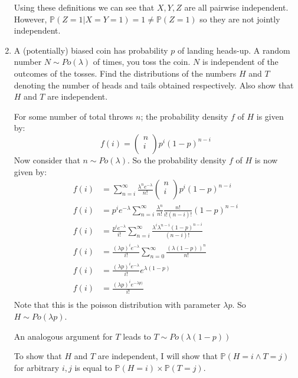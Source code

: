 \documentclass[10pt,\jkfside,a4paper]{article}
\begin{document}
\begin{enumerate}
Using these definitions we can see that $X, Y, Z$ are all pairwise independent.\\
However, $\mathbb{P}(Z=1|X=Y=1) = 1 \neq \mathbb{P}(Z=1)$ so they are not jointly independent.

\item

A (potentially) biased coin has probability $p$ of landing heads-up.
A random number $N \sim Po(\lambda)$ of times, you toss the coin.
$N$ is independent of the outcomes of the tosses.
Find the distributions of the numbers $H$ and $T$ denoting the number
of heads and tails obtained respectively.
Also show that $H$ and $T$ are independent.

For some number of total throws $n$; the probability density $f$ of $H$ is given by:
\[
f(i) = \begin{pmatrix} n \\ i \\ \end{pmatrix} p^i(1-p)^{n - i}
\]
Now consider that $n \sim Po(\lambda)$.
So the probability density $f$ of $H$ is now given
by:
\[
\begin{split}
f(i) &= \sum^{\infty}_{n=i} \frac{\lambda^n e^{-\lambda}}{n!} \begin{pmatrix} n \\ i \\ \end{pmatrix} p^i (1 - p)^{n -
i} \\
f(i) &= p^i e^{-\lambda}\sum^{\infty}_{n=i} \frac{\lambda^n}{n!} \frac{n!}{i!(n - i)!} (1 - p)^{n - i} \\
f(i) &= \frac{p^i e^{-\lambda}}{i!} \sum^{\infty}_{n=i} \frac{\lambda^i \lambda^{n - i} (1 - p)^{n - i}}{(n - i)!} \\
f(i) &= \frac{(\lambda p)^i e^{-\lambda}}{i!} \sum^{\infty}_{n=0} \frac{(\lambda (1 - p))^n}{n!} \\
f(i) &= \frac{(\lambda p)^i e^{-\lambda}}{i!} e^{\lambda(1 - p)} \\
f(i) &= \frac{(\lambda p)^i e^{-\lambda p)}}{i!} \\
\end{split}
\]
Note that this is the poisson distribution with parameter $\lambda p$.
So $H \sim Po(\lambda p)$.

An analogous argument for $T$ leads to $T \sim Po(\lambda (1 - p))$

To show that $H$ and $T$ are independent, I will show that $\mathbb{P}(H=i \wedge T=j)$ for arbitrary
$i, j$ is equal to $\mathbb{P}(H=i) \times \mathbb{P}(T=j)$.


\end{enumerate}
\end{document}
